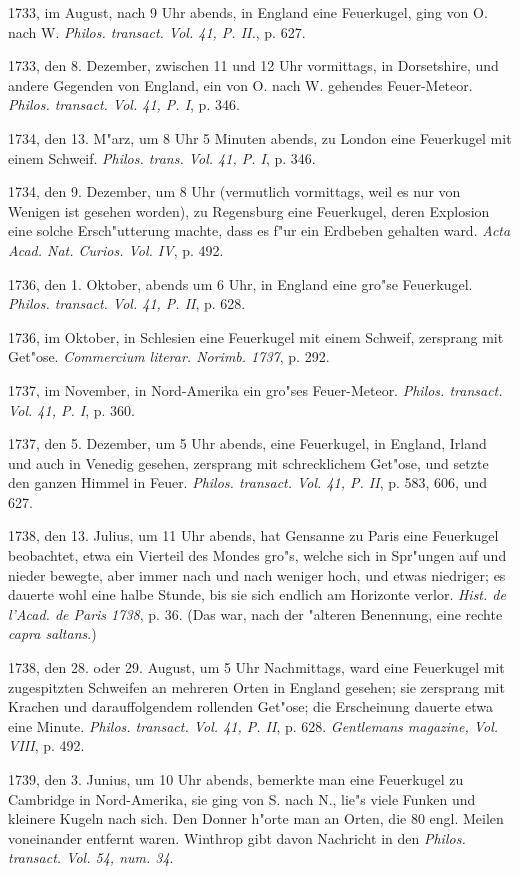 \documentclass[a4paper, 11pt, oneside, polutonikogreek, german]{article}
\begin{document}
1733, im August, nach 9 Uhr abends, in England eine Feuerkugel, ging von O. nach W. \emph{Philos. transact. Vol. 41, P. II.}, p. 627.

1733, den 8. Dezember, zwischen 11 und 12 Uhr vormittags, in Dorsetshire, und andere Gegenden von England, ein von O. nach W. gehendes Feuer-Meteor. \emph{Philos. transact. Vol. 41, P. I}, p. 346.

1734, den 13. M"arz, um 8 Uhr 5 Minuten abends, zu London eine Feuerkugel mit einem Schweif. \emph{Philos. trans. Vol. 41, P. I}, p. 346.

1734, den 9. Dezember, um 8 Uhr (vermutlich vormittags, weil es nur von Wenigen ist gesehen worden), zu Regensburg eine Feuerkugel, deren Explosion eine solche Ersch"utterung machte, dass es f"ur ein Erdbeben gehalten ward. \emph{Acta Acad. Nat. Curios. Vol. IV}, p. 492.

1736, den 1. Oktober, abends um 6 Uhr, in England eine gro"se Feuerkugel. \emph{Philos. transact. Vol. 41, P. II}, p. 628.

1736, im Oktober, in Schlesien eine Feuerkugel mit einem Schweif, zersprang mit Get"ose. \emph{Commercium literar. Norimb. 1737}, p. 292.

1737, im November, in Nord-Amerika ein gro"ses Feuer-Meteor. \emph{Philos. transact. Vol. 41, P. I}, p. 360.

1737, den 5. Dezember, um 5 Uhr abends, eine Feuerkugel, in England, Irland und auch in Venedig gesehen, zersprang mit schrecklichem Get"ose, und setzte den ganzen Himmel in Feuer. \emph{Philos. transact. Vol. 41, P. II}, p. 583, 606, und 627.

1738, den 13. Julius, um 11 Uhr abends, hat Gensanne zu Paris eine Feuerkugel beobachtet, etwa ein Vierteil des Mondes gro"s, welche sich in Spr"ungen auf und nieder bewegte, aber immer nach und nach weniger hoch, und etwas niedriger; es dauerte wohl eine halbe Stunde, bis sie sich endlich am Horizonte verlor. \emph{Hist. de l'Acad. de Paris 1738}, p. 36. (Das war, nach der "alteren Benennung, eine rechte \emph{capra saltans}.)

1738, den 28. oder 29. August, um 5 Uhr Nachmittags, ward eine Feuerkugel mit zugespitzten Schweifen an mehreren Orten in England gesehen; sie zersprang mit Krachen und darauffolgendem rollenden Get"ose; die Erscheinung dauerte etwa eine Minute. \emph{Philos. transact. Vol. 41, P. II}, p. 628. \emph{Gentlemans magazine, Vol. VIII}, p. 492.

1739, den 3. Junius, um 10 Uhr abends, bemerkte man eine Feuerkugel zu Cambridge in Nord-Amerika, sie ging von S. nach N., lie"s viele Funken und kleinere Kugeln nach sich. Den Donner h"orte man an Orten, die 80 engl. Meilen voneinander entfernt waren. Winthrop gibt davon Nachricht in den \emph{Philos. transact. Vol. 54, num. 34}.
\end{document}

